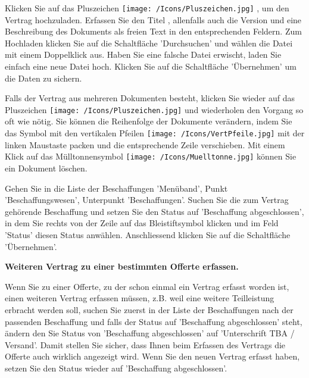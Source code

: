 Klicken Sie auf das Pluszeichen \texttt{[image: /Icons/Pluszeichen.jpg]} , um den Vertrag hochzuladen. Erfassen Sie den Titel , allenfalls auch die Version  und eine Beschreibung des Dokuments  als freien Text in den entsprechenden Feldern. Zum Hochladen klicken Sie auf die Schaltfläche 'Durchsuchen'  und wählen die Datei mit einem Doppelklick aus. Haben Sie eine falsche Datei erwischt, laden Sie einfach eine neue Datei hoch. Klicken Sie auf die Schaltfläche 'Übernehmen'  um die Daten zu sichern.

\vspace{\baselineskip}

Falls der Vertrag aus mehreren Dokumenten besteht, klicken Sie wieder auf das Pluszeichen \texttt{[image: /Icons/Pluszeichen.jpg]}  und wiederholen den Vorgang so oft wie nötig. Sie können die Reihenfolge der Dokumente verändern, indem Sie das Symbol mit den vertikalen Pfeilen \texttt{[image: /Icons/VertPfeile.jpg]}  mit der linken\textcolor{red}{ }Maustaste packen und die entsprechende Zeile verschieben. Mit einem Klick auf das Mülltonnensymbol \texttt{[image: /Icons/Muelltonne.jpg]}  können Sie ein Dokument löschen.

\vspace{\baselineskip}

Gehen Sie in die Liste der Beschaffungen 'Menüband', Punkt 'Beschaffungswesen', Unterpunkt 'Beschaffungen'. Suchen Sie die zum Vertrag gehörende Beschaffung und setzen Sie den Status auf 'Beschaffung abgeschlossen', in dem Sie rechts von der Zeile auf das Bleistiftsymbol klicken und im Feld 'Status' diesen Status anwählen. Anschliessend klicken Sie auf die Schaltfläche 'Übernehmen'.

\vspace{\baselineskip}

\textbf{Weiteren Vertrag zu einer bestimmten Offerte erfassen.}

Wenn Sie zu einer Offerte, zu der schon einmal ein Vertrag erfasst worden ist, einen weiteren Vertrag erfassen müssen, z.B. weil eine weitere Teilleistung erbracht werden soll, suchen Sie zuerst in der Liste der Beschaffungen nach der passenden Beschaffung und falls der Status auf 'Beschaffung abgeschlossen' steht, ändern den Sie Status von 'Beschaffung abgeschlossen' auf 'Unterschrift TBA / Versand'. Damit stellen Sie sicher, dass Ihnen beim Erfassen des Vertrags die Offerte auch wirklich angezeigt wird. Wenn Sie den neuen Vertrag erfasst haben, setzen Sie den Status wieder auf 'Beschaffung abgeschlossen'.

